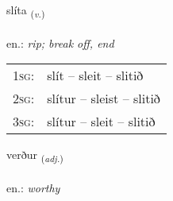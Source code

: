 \documentclass[frontgrid, backgrid]{flacards}\usepackage[]{graphicx}\usepackage[]{xcolor}
\begin{document}
\renewcommand{\flhead}{\vskip5pt \fboxsep=0pt {\small\bfseries\footnotesize Sagnorð | Verb}}
\renewcommand{\fcfoot}{\vskip5pt \fboxsep=0pt \hspace{2pt}{\small\bfseries\footnotesize 2K}}

\renewcommand{\blhead}{\vskip5pt {\small\bfseries\footnotesize Sagnorð | Verb }}
\renewcommand{\bcfoot}{\vskip5pt \hspace{2pt}{\small\bfseries\footnotesize 2K}}


{slíta \small{\textsubscript{(\textit{v.})}} \\[1ex] %
\textphonetic{[stliːta]} \\
en.: \emph{rip; break off, end} \\  [2ex]
\renewcommand*{\arraystretch}{0.8}
\begin{tabular}{p{1cm}l}
\textsc{1sg}: & slít -- sleit -- slitið \\ 
\textsc{2sg}: & slítur -- sleist -- slitið \\ 
\textsc{3sg}: & slítur -- sleit -- slitið \\ 
\end{tabular}
}

\renewcommand{\flhead}{\vskip5pt \fboxsep=0pt {\small\bfseries\footnotesize Lýsingarorð | Adjective}}
\renewcommand{\fcfoot}{\vskip5pt \fboxsep=0pt \hspace{2pt}{\small\bfseries\footnotesize 2K}}

\renewcommand{\blhead}{\vskip5pt {\small\bfseries\footnotesize Lýsingarorð | Adjective }}
\renewcommand{\bcfoot}{\vskip5pt \hspace{2pt}{\small\bfseries\footnotesize 2K}}


{verður \small{\textsubscript{(\textit{adj.})}} \\[1ex] %
\textphonetic{[vɛrðʏr]} \\
en.: \emph{worthy} \\  [2ex]
\renewcommand*{\arraystretch}{0.8}
}
\end{document}
